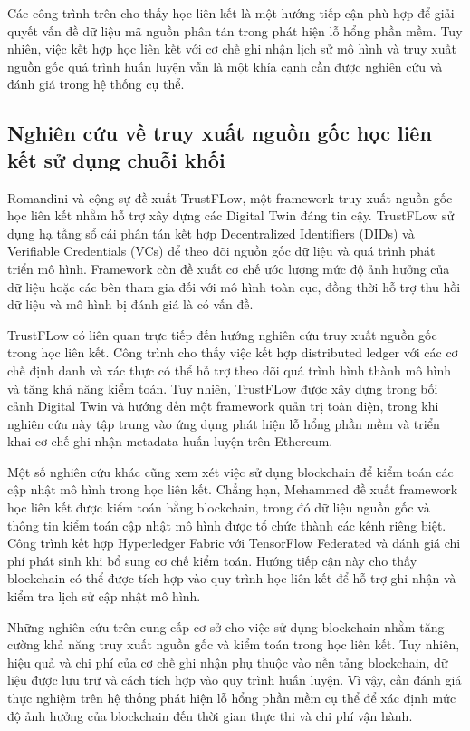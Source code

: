 Các công trình trên cho thấy học liên kết là một hướng tiếp cận phù hợp để giải quyết vấn đề dữ
liệu mã nguồn phân tán trong phát hiện lỗ hổng phần mềm. Tuy nhiên, việc kết hợp học liên kết với
cơ chế ghi nhận lịch sử mô hình và truy xuất nguồn gốc quá trình huấn luyện vẫn là một khía cạnh
cần được nghiên cứu và đánh giá trong hệ thống cụ thể.

\subsection{Nghiên cứu về truy xuất nguồn gốc học liên kết sử dụng chuỗi khối}

Romandini và cộng sự \cite{romandini2026trustflow} đề xuất TrustFLow, một framework truy xuất nguồn
gốc học liên kết nhằm hỗ trợ xây dựng các Digital Twin đáng tin cậy. TrustFLow sử dụng hạ tầng sổ
cái phân tán kết hợp Decentralized Identifiers (DIDs) và Verifiable Credentials (VCs) để theo dõi
nguồn gốc dữ liệu và quá trình phát triển mô hình. Framework còn đề xuất cơ chế ước lượng mức độ
ảnh hưởng của dữ liệu hoặc các bên tham gia đối với mô hình toàn cục, đồng thời hỗ trợ thu hồi dữ
liệu và mô hình bị đánh giá là có vấn đề.

TrustFLow có liên quan trực tiếp đến hướng nghiên cứu truy xuất nguồn gốc trong học liên kết. Công
trình cho thấy việc kết hợp distributed ledger với các cơ chế định danh và xác thực có thể hỗ trợ
theo dõi quá trình hình thành mô hình và tăng khả năng kiểm toán. Tuy nhiên, TrustFLow được xây
dựng trong bối cảnh Digital Twin và hướng đến một framework quản trị toàn diện, trong khi nghiên
cứu này tập trung vào ứng dụng phát hiện lỗ hổng phần mềm và triển khai cơ chế ghi nhận metadata
huấn luyện trên Ethereum.

Một số nghiên cứu khác cũng xem xét việc sử dụng blockchain để kiểm toán các cập nhật mô hình trong
học liên kết. Chẳng hạn, Mehammed \cite{mehammed2025blockchainauditedfl} đề xuất framework học liên
kết được kiểm toán bằng blockchain, trong đó dữ liệu nguồn gốc và thông tin kiểm toán cập nhật mô
hình được tổ chức thành các kênh riêng biệt. Công trình kết hợp Hyperledger Fabric với TensorFlow
Federated và đánh giá chi phí phát sinh khi bổ sung cơ chế kiểm toán. Hướng tiếp cận này cho thấy
blockchain có thể được tích hợp vào quy trình học liên kết để hỗ trợ ghi nhận và kiểm tra lịch sử
cập nhật mô hình.

Những nghiên cứu trên cung cấp cơ sở cho việc sử dụng blockchain nhằm tăng cường khả năng truy xuất
nguồn gốc và kiểm toán trong học liên kết. Tuy nhiên, hiệu quả và chi phí của cơ chế ghi nhận phụ
thuộc vào nền tảng blockchain, dữ liệu được lưu trữ và cách tích hợp vào quy trình huấn luyện. Vì
vậy, cần đánh giá thực nghiệm trên hệ thống phát hiện lỗ hổng phần mềm cụ thể để xác định mức độ
ảnh hưởng của blockchain đến thời gian thực thi và chi phí vận hành.

